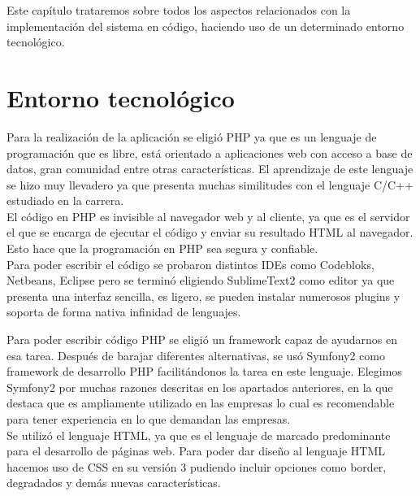 

Este capítulo trataremos sobre todos los aspectos relacionados con la implementación del sistema en código, haciendo uso de un determinado entorno tecnológico.

\section{Entorno tecnológico}

Para la realización de la aplicación se eligió \ac{PHP} ya que es un lenguaje de programación que es libre, está orientado a aplicaciones web con acceso a base de datos, gran comunidad entre otras características. El aprendizaje de este lenguaje se hizo muy llevadero ya que presenta muchas similitudes con el lenguaje C/C++ estudiado en la carrera.\\
El código en \ac{PHP} es invisible al navegador web y al cliente, ya que es el servidor el que se encarga de ejecutar el código y enviar su resultado \ac{HTML} al navegador. Esto hace que la programación en \ac{PHP} sea segura y confiable.\\

Para poder escribir el código se probaron distintos IDEs como Codebloks, Netbeans, Eclipse pero se terminó eligiendo SublimeText2 como editor ya que presenta una interfaz sencilla, es ligero, se pueden instalar numerosos plugins y  soporta de forma nativa infinidad de lenguajes.

Para poder escribir código PHP se eligió un framework capaz de ayudarnos en esa tarea. Después de barajar diferentes alternativas, se usó Symfony2 como framework de desarrollo PHP facilitándonos la tarea en este lenguaje. Elegimos Symfony2 por muchas razones descritas en los apartados anteriores, en la que destaca que es ampliamente utilizado en las empresas lo cual es recomendable para tener experiencia en lo que demandan las empresas. \\

Se utilizó el lenguaje HTML, ya que es el lenguaje de marcado predominante para el desarrollo de páginas web. Para poder dar diseño al lenguaje HTML hacemos uso de \ac{CSS} en su versión 3 pudiendo incluir opciones como border, degradados y demás nuevas características.

